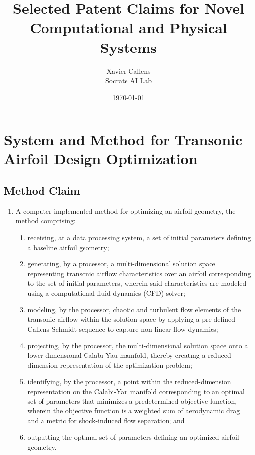 \documentclass{article}
\title{\textbf{Selected Patent Claims for Novel Computational and Physical Systems}}
\author{Xavier Callens \\ Socrate AI Lab}
\date{\today}
\begin{document}
\maketitle

\section{System and Method for Transonic Airfoil Design Optimization}
\subsection{Method Claim}
\begin{enumerate}
    \item[1.] A computer-implemented method for optimizing an airfoil geometry, the method comprising:
    \begin{enumerate}
        \item[(a)] receiving, at a data processing system, a set of initial parameters defining a baseline airfoil geometry;
        \item[(b)] generating, by a processor, a multi-dimensional solution space representing transonic airflow characteristics over an airfoil corresponding to the set of initial parameters, wherein said characteristics are modeled using a computational fluid dynamics (CFD) solver;
        \item[(c)] modeling, by the processor, chaotic and turbulent flow elements of the transonic airflow within the solution space by applying a pre-defined Callens-Schmidt sequence to capture non-linear flow dynamics;
        \item[(d)] projecting, by the processor, the multi-dimensional solution space onto a lower-dimensional Calabi-Yau manifold, thereby creating a reduced-dimension representation of the optimization problem;
        \item[(e)] identifying, by the processor, a point within the reduced-dimension representation on the Calabi-Yau manifold corresponding to an optimal set of parameters that minimizes a predetermined objective function, wherein the objective function is a weighted sum of aerodynamic drag and a metric for shock-induced flow separation; and
        \item[(f)] outputting the optimal set of parameters defining an optimized airfoil geometry.
    \end{enumerate}
\end{enumerate}
\end{document}
